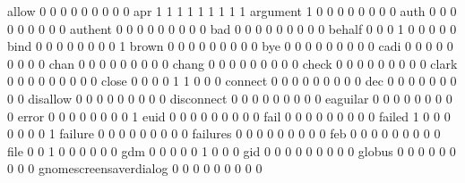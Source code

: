 \documentclass[compress,8pt]{beamer}
\begin{document}
\begin{frame}
\begin{Schunk}
  allow                                      0   0   0   0   0   0   0   0   0
  apr                                        1   1   1   1   1   1   1   1   1
  argument                                   1   0   0   0   0   0   0   0   0
  auth                                       0   0   0   0   0   0   0   0   0
  authent                                    0   0   0   0   0   0   0   0   0
  bad                                        0   0   0   0   0   0   0   0   0
  behalf                                     0   0   0   1   0   0   0   0   0
  bind                                       0   0   0   0   0   0   0   0   1
  brown                                      0   0   0   0   0   0   0   0   0
  bye                                        0   0   0   0   0   0   0   0   0
  cadi                                       0   0   0   0   0   0   0   0   0
  chan                                       0   0   0   0   0   0   0   0   0
  chang                                      0   0   0   0   0   0   0   0   0
  check                                      0   0   0   0   0   0   0   0   0
  clark                                      0   0   0   0   0   0   0   0   0
  close                                      0   0   0   0   1   1   0   0   0
  connect                                    0   0   0   0   0   0   0   0   0
  dec                                        0   0   0   0   0   0   0   0   0
  disallow                                   0   0   0   0   0   0   0   0   0
  disconnect                                 0   0   0   0   0   0   0   0   0
  eaguilar                                   0   0   0   0   0   0   0   0   0
  error                                      0   0   0   0   0   0   0   0   1
  euid                                       0   0   0   0   0   0   0   0   0
  fail                                       0   0   0   0   0   0   0   0   0
  failed                                     1   0   0   0   0   0   0   0   1
  failure                                    0   0   0   0   0   0   0   0   0
  failures                                   0   0   0   0   0   0   0   0   0
  feb                                        0   0   0   0   0   0   0   0   0
  file                                       0   0   1   0   0   0   0   0   0
  gdm                                        0   0   0   0   0   1   0   0   0
  gid                                        0   0   0   0   0   0   0   0   0
  globus                                     0   0   0   0   0   0   0   0   0
  gnomescreensaverdialog                     0   0   0   0   0   0   0   0   0

\end{Schunk}
\end{frame}
\end{document}
